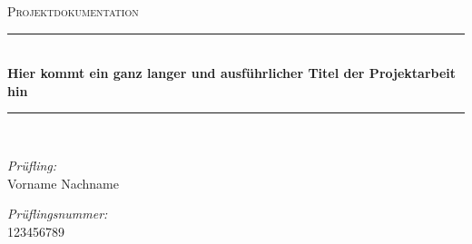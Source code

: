 \begin{titlepage}

\begin{center}



\textsc{\huge Projektdokumentation}\\[1.5cm]



\newcommand{\HRule}{\rule{\linewidth}{0.5mm}}
\HRule \\[0.4cm]
{ \huge \bfseries Hier kommt ein ganz langer und ausführlicher Titel der Projektarbeit hin}\\[0.4cm]

\HRule \\[1.5cm]

\begin{minipage}{0.5\textwidth}
\begin{flushleft} \large
\emph{Prüfling:}\\
Vorname Nachname
\end{flushleft}
\end{minipage}
\par\bigskip
\par\bigskip

\begin{minipage}{0.5\textwidth}
\begin{flushleft} \large
\emph{Prüflingsnummer:}\\
123456789
\end{flushleft}
\end{minipage}
\par\bigskip
\par\bigskip


\end{center}
\end{titlepage}

